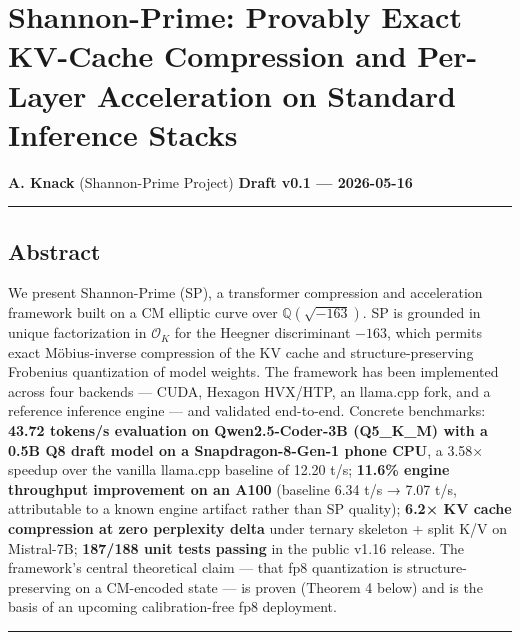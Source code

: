 \documentclass[
  11pt,
]{article}
\author{}
\date{}
\begin{document}
\hypertarget{shannon-prime-provably-exact-kv-cache-compression-and-per-layer-acceleration-on-standard-inference-stacks}{%
\section{Shannon-Prime: Provably Exact KV-Cache Compression and
Per-Layer Acceleration on Standard Inference
Stacks}\label{shannon-prime-provably-exact-kv-cache-compression-and-per-layer-acceleration-on-standard-inference-stacks}}

\textbf{A. Knack} (Shannon-Prime Project) \textbf{Draft v0.1 ---
2026-05-16}

\begin{center}\rule{0.5\linewidth}{0.5pt}\end{center}

\hypertarget{abstract}{%
\subsection{Abstract}\label{abstract}}

We present Shannon-Prime (SP), a transformer compression and
acceleration framework built on a CM elliptic curve over
\(\mathbb{Q}(\sqrt{-163})\). SP is grounded in unique factorization in
\(\mathcal{O}_K\) for the Heegner discriminant \(-163\), which permits
exact Möbius-inverse compression of the KV cache and
structure-preserving Frobenius quantization of model weights. The
framework has been implemented across four backends --- CUDA, Hexagon
HVX/HTP, an llama.cpp fork, and a reference inference engine --- and
validated end-to-end. Concrete benchmarks: \textbf{43.72 tokens/s
evaluation on Qwen2.5-Coder-3B (Q5\_K\_M) with a 0.5B Q8 draft model on
a Snapdragon-8-Gen-1 phone CPU}, a 3.58× speedup over the vanilla
llama.cpp baseline of 12.20 t/s; \textbf{11.6\% engine throughput
improvement on an A100} (baseline 6.34 t/s → 7.07 t/s, attributable to a
known engine artifact rather than SP quality); \textbf{6.2× KV cache
compression at zero perplexity delta} under ternary skeleton + split K/V
on Mistral-7B; \textbf{187/188 unit tests passing} in the public v1.16
release. The framework's central theoretical claim --- that fp8
quantization is structure-preserving on a CM-encoded state --- is proven
(Theorem 4 below) and is the basis of an upcoming calibration-free fp8
deployment.

\begin{center}\rule{0.5\linewidth}{0.5pt}\end{center}
\end{document}
